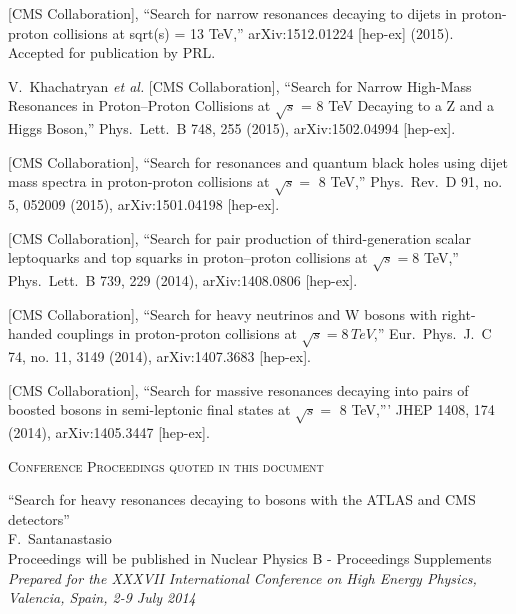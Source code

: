 \documentclass[10pt, a4paper]{article}
\begin{document}
\clearpage


\begin{thebibliography}{599}


  [CMS Collaboration],
  ``Search for narrow resonances decaying to dijets in proton-proton collisions at sqrt(s) = 13 TeV,''
  arXiv:1512.01224 [hep-ex] (2015). Accepted for publication by PRL.

  V.~Khachatryan {\it et al.} [CMS Collaboration],
  ``Search for Narrow High-Mass Resonances in Proton–Proton Collisions at $\sqrt{s}$ = 8 TeV Decaying to a Z and a Higgs Boson,''
  Phys.\ Lett.\ B 748, 255 (2015), arXiv:1502.04994 [hep-ex].

  [CMS Collaboration],
  ``Search for resonances and quantum black holes using dijet mass spectra in proton-proton collisions at $\sqrt{s} =$ 8 TeV,''
  Phys.\ Rev.\ D 91, no. 5, 052009 (2015), arXiv:1501.04198 [hep-ex].

  [CMS Collaboration],
  ``Search for pair production of third-generation scalar leptoquarks and top squarks in proton–proton collisions at $\sqrt{s}=$8 TeV,''
  Phys.\ Lett.\ B 739, 229 (2014), arXiv:1408.0806 [hep-ex].

  [CMS Collaboration],
  ``Search for heavy neutrinos and $\mathrm {W}$ bosons with
  right-handed couplings in proton-proton collisions at $\sqrt{s} = 8 \, TeV $,''
  Eur.\ Phys.\ J.\ C 74, no. 11, 3149 (2014), arXiv:1407.3683 [hep-ex].

  [CMS Collaboration],
  ``Search for massive resonances decaying into pairs of boosted bosons in semi-leptonic final states at $\sqrt{s} =$ 8 TeV,'''
  JHEP 1408, 174 (2014), arXiv:1405.3447 [hep-ex].


\vspace{0.1cm} \begin{center} \textsc{Conference Proceedings quoted in
    this document} \end{center} \vspace{0.05cm}

  ``Search for heavy resonances decaying to bosons with the ATLAS and CMS detectors''
  \\{}F.~Santanastasio
   \\{} Proceedings will be published in Nuclear Physics B - Proceedings Supplements
  \\{}{\it Prepared for the XXXVII International Conference on High Energy Physics, Valencia, Spain, 2-9 July 2014}


\end{thebibliography}
\end{document}
